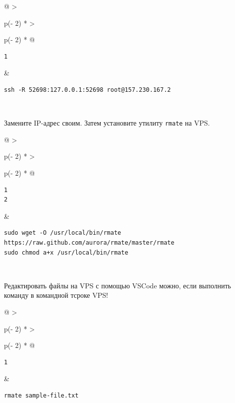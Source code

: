 \documentclass{article}
\begin{document}
\begin{longtable}[]{@{}
  >{\raggedright\arraybackslash}p{(\columnwidth - 2\tabcolsep) * }
  >{\raggedright\arraybackslash}p{(\columnwidth - 2\tabcolsep) * }@{}}
\toprule
\endhead
\begin{minipage}[t]{\linewidth}\raggedright
\begin{verbatim}
1
\end{verbatim}
\end{minipage} & \begin{minipage}[t]{\linewidth}\raggedright
\begin{verbatim}
ssh -R 52698:127.0.0.1:52698 root@157.230.167.2
\end{verbatim}
\end{minipage} \\ \addlinespace
\bottomrule
\end{longtable}

Замените IP-адрес своим. Затем установите утилиту \texttt{rmate} на VPS.

\begin{longtable}[]{@{}
  >{\raggedright\arraybackslash}p{(\columnwidth - 2\tabcolsep) * }
  >{\raggedright\arraybackslash}p{(\columnwidth - 2\tabcolsep) * }@{}}
\toprule
\endhead
\begin{minipage}[t]{\linewidth}\raggedright
\begin{verbatim}
1
2
\end{verbatim}
\end{minipage} & \begin{minipage}[t]{\linewidth}\raggedright
\begin{verbatim}
sudo wget -O /usr/local/bin/rmate https://raw.github.com/aurora/rmate/master/rmate
sudo chmod a+x /usr/local/bin/rmate
\end{verbatim}
\end{minipage} \\ \addlinespace
\bottomrule
\end{longtable}

Редактировать файлы на VPS с помощью VSCode можно, если выполнить
команду в командной тсроке VPS!

\begin{longtable}[]{@{}
  >{\raggedright\arraybackslash}p{(\columnwidth - 2\tabcolsep) * }
  >{\raggedright\arraybackslash}p{(\columnwidth - 2\tabcolsep) * }@{}}
\toprule
\endhead
\begin{minipage}[t]{\linewidth}\raggedright
\begin{verbatim}
1
\end{verbatim}
\end{minipage} & \begin{minipage}[t]{\linewidth}\raggedright
\begin{verbatim}
rmate sample-file.txt
\end{verbatim}
\end{minipage} \\ \addlinespace
\bottomrule
\end{longtable}
\end{document}
